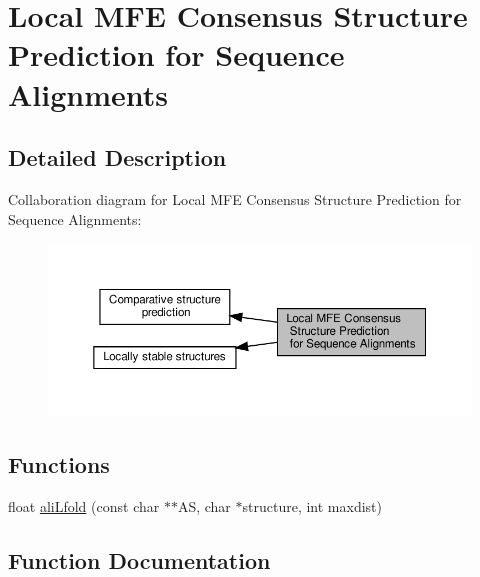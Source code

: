 \hypertarget{group__local__consensus__fold}{}\section{Local M\+FE Consensus Structure Prediction for Sequence Alignments}
\label{group__local__consensus__fold}


\subsection{Detailed Description}
Collaboration diagram for Local M\+FE Consensus Structure Prediction for Sequence Alignments\+:
\nopagebreak
\begin{figure}[H]
\begin{center}
\leavevmode
\includegraphics[width=350pt]{group__local__consensus__fold}
\end{center}
\end{figure}
\subsection*{Functions}
\begin{DoxyCompactItemize}
\item 
float \hyperlink{group__local__consensus__fold_ga864db0f9c428356d978ad0600aa9a8bc}{ali\+Lfold} (const char $\ast$$\ast$AS, char $\ast$structure, int maxdist)
\end{DoxyCompactItemize}


\subsection{Function Documentation}
\mbox{\label{group__local__consensus__fold_ga864db0f9c428356d978ad0600aa9a8bc}} 

